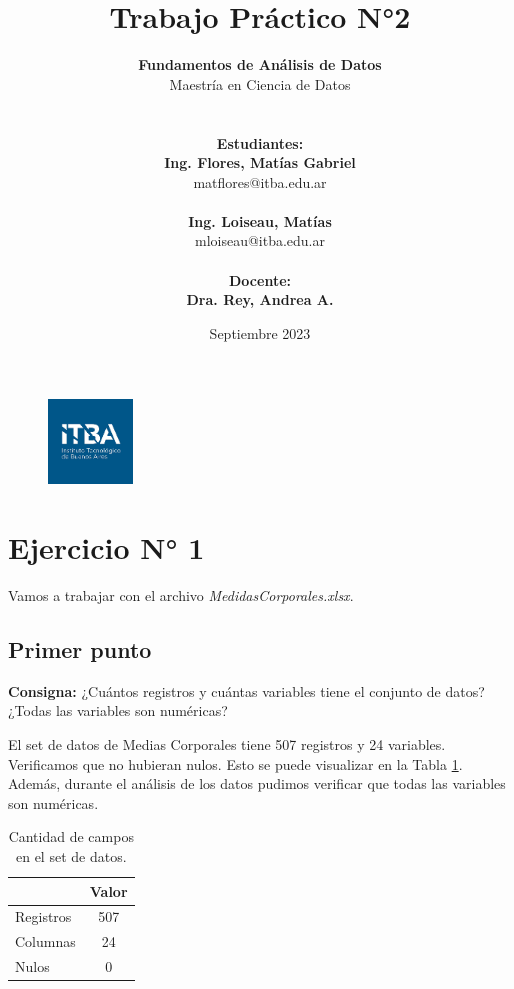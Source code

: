 \documentclass{article} %
\title{Trabajo Práctico N°2} %
\date{Septiembre 2023} %
\author{
	\textbf{Fundamentos de Análisis de Datos}\\
	Maestría en Ciencia de Datos\\
	\\~\\
	\textbf{Estudiantes: }\\
	\textbf{Ing. Flores, Matías Gabriel}\\
	matflores@itba.edu.ar
 	\\~\\
 	\textbf{Ing. Loiseau, Matías}\\
 	mloiseau@itba.edu.ar
 	\\~\\
	\textbf{Docente: }\\
	\textbf{Dra. Rey, Andrea A.}
}
\begin{document}

\begin{figure}
\centering
	\includegraphics[width=0.2\textwidth]{images/itba-logo}
	\label{fig:itba-logo}
\end{figure}
\maketitle %

\thispagestyle{empty} %
\cleardoublepage

\cleardoublepage
\tableofcontents %
\cleardoublepage


\section{Ejercicio N° 1}

Vamos a trabajar con el archivo \textit{MedidasCorporales.xlsx}.

\subsection{Primer punto}

\textbf{Consigna:} ¿Cuántos registros y cuántas variables tiene el conjunto de datos? ¿Todas las variables
son numéricas?

El set de datos de Medias Corporales tiene 507 registros y 24 variables. Verificamos que no hubieran nulos. Esto se puede visualizar en la Tabla \ref{tab:table-punto-1-1}. Además, durante el análisis de los datos pudimos verificar que todas las variables son numéricas.

\begin{table}[H]
	\centering
		\begin{tabular}{||l | c ||}
			\hline
			\hline
			 & Valor\\
			\hline			
			\hline
			Registros & 507\\
			\hline
			Columnas & 24\\
			\hline
			Nulos & 0 \\
			\hline
			\hline
		\end{tabular}
		\caption{Cantidad de campos en el set de datos.}
	\label{tab:table-punto-1-1}
\end{table}
\end{document}

